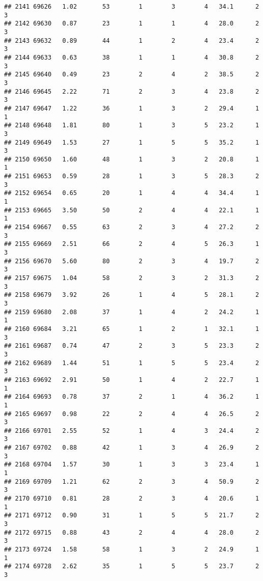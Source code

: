 \documentclass[
]{article}
\begin{document}
\begin{verbatim}
## 2141 69626   1.02       53        1        3        4   34.1      2      3
## 2142 69630   0.87       23        1        1        4   28.0      2      3
## 2143 69632   0.89       44        1        2        4   23.4      2      3
## 2144 69633   0.63       38        1        1        4   30.8      2      3
## 2145 69640   0.49       23        2        4        2   38.5      2      3
## 2146 69645   2.22       71        2        3        4   23.8      2      3
## 2147 69647   1.22       36        1        3        2   29.4      1      1
## 2148 69648   1.81       80        1        3        5   23.2      1      3
## 2149 69649   1.53       27        1        5        5   35.2      1      3
## 2150 69650   1.60       48        1        3        2   20.8      1      1
## 2151 69653   0.59       28        1        3        5   28.3      2      3
## 2152 69654   0.65       20        1        4        4   34.4      1      1
## 2153 69665   3.50       50        2        4        4   22.1      1      1
## 2154 69667   0.55       63        2        3        4   27.2      2      3
## 2155 69669   2.51       66        2        4        5   26.3      1      3
## 2156 69670   5.60       80        2        3        4   19.7      2      3
## 2157 69675   1.04       58        2        3        2   31.3      2      3
## 2158 69679   3.92       26        1        4        5   28.1      2      3
## 2159 69680   2.08       37        1        4        2   24.2      1      1
## 2160 69684   3.21       65        1        2        1   32.1      1      3
## 2161 69687   0.74       47        2        3        5   23.3      2      3
## 2162 69689   1.44       51        1        5        5   23.4      2      3
## 2163 69692   2.91       50        1        4        2   22.7      1      1
## 2164 69693   0.78       37        2        1        4   36.2      1      1
## 2165 69697   0.98       22        2        4        4   26.5      2      3
## 2166 69701   2.55       52        1        4        3   24.4      2      3
## 2167 69702   0.88       42        1        3        4   26.9      2      3
## 2168 69704   1.57       30        1        3        3   23.4      1      1
## 2169 69709   1.21       62        2        3        4   50.9      2      3
## 2170 69710   0.81       28        2        3        4   20.6      1      1
## 2171 69712   0.90       31        1        5        5   21.7      2      3
## 2172 69715   0.88       43        2        4        4   28.0      2      3
## 2173 69724   1.58       58        1        3        2   24.9      1      1
## 2174 69728   2.62       35        1        5        5   23.7      2      3

\end{verbatim}
\end{document}
